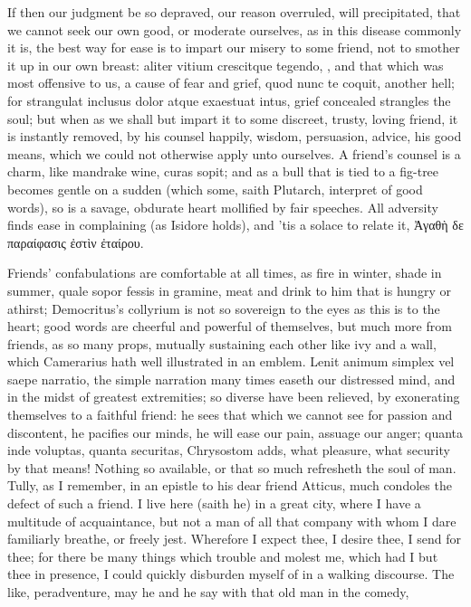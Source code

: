 {If then our judgment be so depraved, our reason overruled, will
precipitated, that we cannot seek our own good, or moderate ourselves,
as in this disease commonly it is, the best way for ease is to impart
our misery to some friend, not to smother it up in our own breast:
aliter vitium crescitque tegendo, \etc{}, and that which was most
offensive to us, a cause of fear and grief, quod nunc te coquit,
another hell; for  strangulat inclusus dolor atque exaestuat
intus, grief concealed strangles the soul; but when as we shall but
impart it to some discreet, trusty, loving friend, it is
instantly removed, by his counsel happily, wisdom, persuasion,
advice, his good means, which we could not otherwise apply unto
ourselves. A friend's counsel is a charm, like mandrake wine, curas
sopit; and as a bull that is tied to a fig-tree becomes gentle on
a sudden (which some, saith Plutarch, interpret of good words),
so is a savage, obdurate heart mollified by fair speeches. All
adversity finds ease in complaining (as Isidore holds), and 'tis
a solace to relate it, \textgreek{Ἀγαθὴ δε παραίφασις ἐστὶν ἐταίρου}.

Friends' confabulations are comfortable at all times, as fire in
winter, shade in summer, quale sopor fessis in gramine, meat and drink
to him that is hungry or athirst; Democritus's collyrium is not so
sovereign to the eyes as this is to the heart; good words are cheerful
and powerful of themselves, but much more from friends, as so many
props, mutually sustaining each other like ivy and a wall, which
Camerarius hath well illustrated in an emblem. Lenit animum simplex vel
saepe narratio, the simple narration many times easeth our distressed
mind, and in the midst of greatest extremities; so diverse have been
relieved, by exonerating themselves to a faithful friend: he sees
that which we cannot see for passion and discontent, he pacifies our
minds, he will ease our pain, assuage our anger; quanta inde voluptas,
quanta securitas, Chrysostom adds, what pleasure, what security by that
means! Nothing so available, or that so much refresheth the soul
of man. Tully, as I remember, in an epistle to his dear friend Atticus,
much condoles the defect of such a friend. I live here (saith he)
in a great city, where I have a multitude of acquaintance, but not a
man of all that company with whom I dare familiarly breathe, or freely
jest. Wherefore I expect thee, I desire thee, I send for thee; for
there be many things which trouble and molest me, which had I but thee
in presence, I could quickly disburden myself of in a walking
discourse. The like, peradventure, may he and he say with that old man
in the comedy,

}

